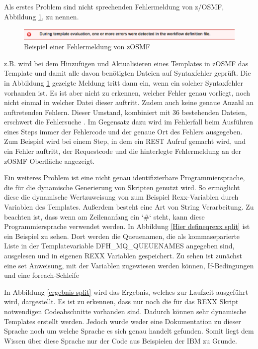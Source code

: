 Als erstes Problem sind nicht sprechenden Fehlermeldung von z/OSMF, Abbildung \ref{fig:zosmffehler}, zu nennen.
\begin{figure}[h]
	\centering
	\includegraphics[width=\textwidth]{figures/zosmffehlermeldung.png}
	\caption{Beispiel einer Fehlermeldung von zOSMF}
	\label{fig:zosmffehler}
\end{figure}
z.B. wird bei dem Hinzufügen und Aktualisieren eines Templates in zOSMF das Template und damit alle davon benötigten Dateien auf Syntaxfehler geprüft.
Die in Abbildung \ref{fig:zosmffehler} gezeigte Meldung tritt dann ein, wenn ein solcher Syntaxfehler vorhanden ist.
Es ist aber nicht zu erkennen, welcher Fehler genau vorliegt, noch nicht einmal in welcher Datei dieser auftritt.
Zudem auch keine genaue Anzahl an auftretenden Fehlern.
Dieser Umstand, kombiniert mit 36 bestehenden Dateien, erschwert die Fehlersuche .
Im Gegensatz dazu wird im Fehlerfall beim Ausführen eines Steps immer der Fehlercode und der genaue Ort des Fehlers ausgegeben.
Zum Beispiel wird bei einem Step, in dem ein REST Aufruf gemacht wird, und ein Fehler auftritt, der Requestcode und die hinterlegte Fehlermeldung an der zOSMF Oberfläche angezeigt. 

Ein weiteres Problem ist eine nicht genau identifizierbare Programmiersprache, die für die dynamische Generierung von Skripten genutzt wird.
So ermöglicht diese die dynamische Wertzuweisung von zum Beispiel Rexx-Variablen durch Variablen des Templates.
Außerdem besteht eine Art von String Verarbeitung.
Zu beachten ist, dass wenn am Zeilenanfang ein `\#` steht, kann diese Programmiersprache verwendet werden.
In Abbildung \ref{Hier defineqrexx split} ist ein Beispiel zu sehen.
Dort werden die Queuenamen, die als kommaseparierte Liste in der Templatevariable \glqq DFH\_MQ\_QUEUENAMES\grqq{} angegeben sind, ausgelesen und in eigenen REXX Variablen gespeichert.
Zu sehen ist zunächst eine \glqq set\grqq{} Anweisung, mit der Variablen zugewiesen werden können, If-Bedingungen und eine foreach-Schleife 

In Abbildung \ref{ergebnis split} wird das Ergebnis, welches zur Laufzeit ausgeführt wird, dargestellt.
Es ist zu erkennen, dass nur noch die für das REXX Skript notwendigen Codeabschnitte vorhanden sind.
Dadurch können sehr dynamische Templates erstellt werden.
Jedoch wurde weder eine Dokumentation zu dieser Sprache noch um welche Sprache es sich genau handelt gefunden.
Somit liegt dem Wissen über diese Sprache nur der Code aus Beispielen der IBM zu Grunde.

